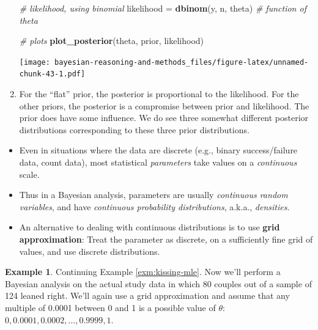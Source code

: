 \documentclass[
]{book}
\newenvironment{Shaded}{\begin{snugshade}}{\end{snugshade}}
\newcommand{\CommentTok}[1]{\textcolor[rgb]{0.56,0.35,0.01}{\textit{#1}}}
\newcommand{\KeywordTok}[1]{\textcolor[rgb]{0.13,0.29,0.53}{\textbf{#1}}}
\newcommand{\NormalTok}[1]{#1}
\newcommand{\StringTok}[1]{\textcolor[rgb]{0.31,0.60,0.02}{#1}}
\providecommand{\tightlist}{%
  \setlength{\itemsep}{0pt}\setlength{\parskip}{0pt}}
\theoremstyle{definition}
\theoremstyle{definition}
\newtheorem{example}{Example}[chapter]
\theoremstyle{definition}
\theoremstyle{remark}
\begin{document}
\begin{enumerate}
\begin{Shaded}
\begin{Highlighting}[]
\CommentTok{\# likelihood, using binomial}
\NormalTok{likelihood =}\StringTok{ }\KeywordTok{dbinom}\NormalTok{(y, n, theta) }\CommentTok{\# function of theta}

\CommentTok{\# plots}
\KeywordTok{plot\_posterior}\NormalTok{(theta, prior, likelihood)}
\end{Highlighting}
\end{Shaded}

  \texttt{[image: bayesian-reasoning-and-methods\_files/figure-latex/unnamed-chunk-43-1.pdf]}
\item
  For the ``flat'' prior, the posterior is proportional to the likelihood. For the other priors, the posterior is a compromise between prior and likelihood. The prior does have some influence. We do see three somewhat different posterior distributions corresponding to these three prior distributions.
\end{enumerate}

\begin{itemize}
\tightlist
\item
  Even in situations where the data are discrete (e.g., binary success/failure data, count data), most statistical \emph{parameters} take values on a \emph{continuous} scale.
\item
  Thus in a Bayesian analysis, parameters are usually \emph{continuous random variables}, and have \emph{continuous probability distributions}, a.k.a., \emph{densities}.
\item
  An alternative to dealing with continuous distributions is to use \textbf{grid approximation}: Treat the parameter as discrete, on a sufficiently fine grid of values, and use discrete distributions.
\end{itemize}

\begin{example}
\protect\hypertarget{exm:kissing-discrete3}{}{\label{exm:kissing-discrete3} }
Continuing Example \ref{exm:kissing-mle}.
Now we'll perform a Bayesian analysis on the actual study data in which 80 couples out of a sample of 124 leaned right.
We'll again use a grid approximation and assume that any multiple of 0.0001 between 0 and 1 is a possible value of \(\theta\): \(0, 0.0001, 0.0002, \ldots, 0.9999, 1\).
\end{example}
\end{document}
